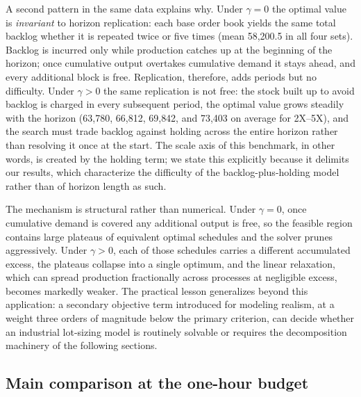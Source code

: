 A second pattern in the same data explains why. Under $\gamma=0$ the
optimal value is \emph{invariant} to horizon replication: each base
order book yields the same total backlog whether it is repeated twice
or five times (mean 58{,}200.5 in all four sets). Backlog is incurred
only while production catches up at the beginning of the horizon; once
cumulative output overtakes cumulative demand it stays ahead, and
every additional block is free. Replication, therefore, adds periods
but no difficulty. Under $\gamma>0$ the same replication is not free:
the stock built up to avoid backlog is charged in every subsequent
period, the optimal value grows steadily with the horizon (63{,}780,
66{,}812, 69{,}842, and 73{,}403 on average for 2X--5X), and the
search must trade backlog against holding across the entire horizon
rather than resolving it once at the start. The scale axis of this
benchmark, in other words, is created by the holding term; we state
this explicitly because it delimits our results, which characterize
the difficulty of the backlog-plus-holding model rather than of
horizon length as such.

The mechanism is structural rather than numerical. Under
$\gamma=0$, once cumulative demand is covered any additional output is
free, so the feasible region contains large plateaus of equivalent
optimal schedules and the solver prunes aggressively. Under
$\gamma>0$, each of those schedules carries a different accumulated
excess, the plateaus collapse into a single optimum, and the linear
relaxation, which can spread production fractionally across
processes at negligible excess, becomes markedly weaker. The
practical lesson generalizes beyond this application: a secondary
objective term introduced for modeling realism, at a weight three
orders of magnitude below the primary criterion, can decide whether an
industrial lot-sizing model is routinely solvable or requires the
decomposition machinery of the following sections.

\subsection{Main comparison at the one-hour budget}
\label{sec:main3600}

